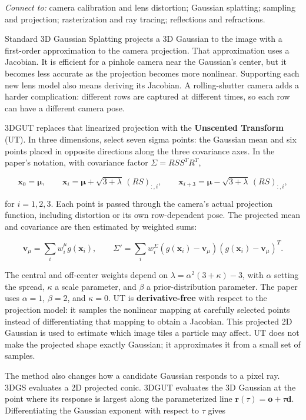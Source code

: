 \emph{Connect to:} camera calibration and lens distortion; Gaussian splatting; sampling and projection; rasterization and ray tracing; reflections and refractions.

Standard 3D Gaussian Splatting projects a 3D Gaussian to the image with a first-order approximation to the camera projection. That approximation uses a Jacobian. It is efficient for a pinhole camera near the Gaussian's center, but it becomes less accurate as the projection becomes more nonlinear. Supporting each new lens model also means deriving its Jacobian. A rolling-shutter camera adds a harder complication: different rows are captured at different times, so each row can have a different camera pose.

3DGUT replaces that linearized projection with the \textbf{Unscented Transform} (UT). In three dimensions, select seven sigma points: the Gaussian mean and six points placed in opposite directions along the three covariance axes. In the paper's notation, with covariance factor \(\Sigma=RSS^TR^T\),

\[\mathbf{x}_0=\boldsymbol\mu,\qquad \mathbf{x}_{i}=\boldsymbol\mu+\sqrt{3+\lambda}\,(RS)_{:,i},\qquad \mathbf{x}_{i+3}=\boldsymbol\mu-\sqrt{3+\lambda}\,(RS)_{:,i},\]

for \(i=1,2,3\). Each point is passed through the camera's actual projection function, including distortion or its own row-dependent pose. The projected mean and covariance are then estimated by weighted sums:

\[\mathbf{v}_\mu=\sum_i w_i^\mu g(\mathbf{x}_i),\qquad \Sigma'=\sum_i w_i^\Sigma(g(\mathbf{x}_i)-\mathbf{v}_\mu)(g(\mathbf{x}_i)-\mathbf{v}_\mu)^T.\]

The central and off-center weights depend on \(\lambda=\alpha^2(3+\kappa)-3\), with \(\alpha\) setting the spread, \(\kappa\) a scale parameter, and \(\beta\) a prior-distribution parameter. The paper uses \(\alpha=1\), \(\beta=2\), and \(\kappa=0\). UT is \textbf{derivative-free} with respect to the projection model: it samples the nonlinear mapping at carefully selected points instead of differentiating that mapping to obtain a Jacobian. This projected 2D Gaussian is used to estimate which image tiles a particle may affect. UT does not make the projected shape exactly Gaussian; it approximates it from a small set of samples.

The method also changes how a candidate Gaussian responds to a pixel ray. 3DGS evaluates a 2D projected conic. 3DGUT evaluates the 3D Gaussian at the point where its response is largest along the parameterized line \(\mathbf{r}(\tau)=\mathbf{o}+\tau\mathbf{d}\). Differentiating the Gaussian exponent with respect to \(\tau\) gives


